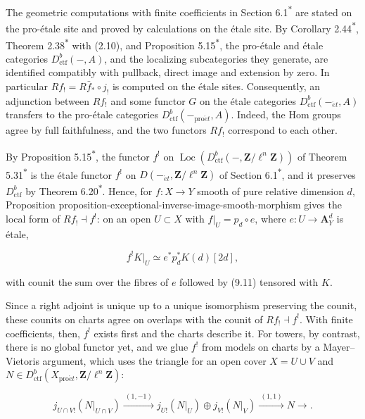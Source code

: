 \documentclass[11pt]{article}
\newcommand{\bpout}[1]{#1\textsuperscript{\hyperlink{bp-outside}{\ensuremath{\ast}}}}
\providecommand{\Loc}{}\renewcommand{\Loc}{\operatorname{Loc}}
\begin{document}
\label{bp20}%
The geometric computations with finite coefficients in Section \bpout{6.1} are stated on the pro-étale site and proved by calculations on the étale site. By Corollary \bpout{2.44}, Theorem \bpout{2.38} with (2.10), and Proposition \bpout{5.15}, the pro-étale and étale categories \(D^b_{\mathrm{ctf}}(-,A)\), and the localizing subcategories they generate, are identified compatibly with pullback, direct image and extension by zero. In particular \(Rf_!=R\bar f_*\circ j_!\) is computed on the étale sites. Consequently, an adjunction between \(Rf_!\) and some functor \(G\) on the étale categories \(D^b_{\mathrm{ctf}}(-_{\acute{e}t},A)\) transfers to the pro-étale categories \(D^b_{\mathrm{ctf}}(-_{\mathrm{pro}\acute{e}t},A)\). Indeed, the Hom groups agree by full faithfulness, and the two functors \(Rf_!\) correspond to each other.

By Proposition \bpout{5.15}, the functor \(f^!\) on \(\Loc(D^b_{\mathrm{ctf}}(-,\mathbf Z/\ell^n\mathbf Z))\) of Theorem \bpout{5.31} is the étale functor \(f^!\) on \(D(-_{\acute{e}t},\mathbf Z/\ell^n\mathbf Z)\) of Section \bpout{6.1}, and it preserves \(D^b_{\mathrm{ctf}}\) by Theorem \bpout{6.20}. Hence, for \(f:X\to Y\) smooth of pure relative dimension \(d\), Proposition proposition-exceptional-inverse-image-smooth-morphism gives the local form of \(Rf_!\dashv f^!\): on an open \(U\subset X\) with \(f|_U=p_d\circ e\), where \(e:U\to\mathbf A^d_Y\) is étale,

\[
f^!K|_U\simeq e^*p_{d}^*K(d)[2d],
\]

with counit the sum over the fibres of \(e\) followed by (9.11) tensored with \(K\).

Since a right adjoint is unique up to a unique isomorphism preserving the counit, these counits on charts agree on overlaps with the counit of \(Rf_!\dashv f^!\). With finite coefficients, then, \(f^!\) exists first and the charts describe it. For towers, by contrast, there is no global functor yet, and we glue \(f^!\) from models on charts by a Mayer–Vietoris argument, which uses the triangle for an open cover \(X=U\cup V\) and \(N\in D^b_{\mathrm{ctf}}(X_{\mathrm{pro}\acute{e}t},\mathbf Z/\ell^n\mathbf Z)\):

\[
j_{U\cap V!}(N|_{U\cap V})
\xrightarrow{\ (1,-1)\ }
j_{U!}(N|_U)\oplus j_{V!}(N|_V)
\xrightarrow{\ (1,1)\ }N\longrightarrow{} .
\tag{9.12}
\]
\end{document}
